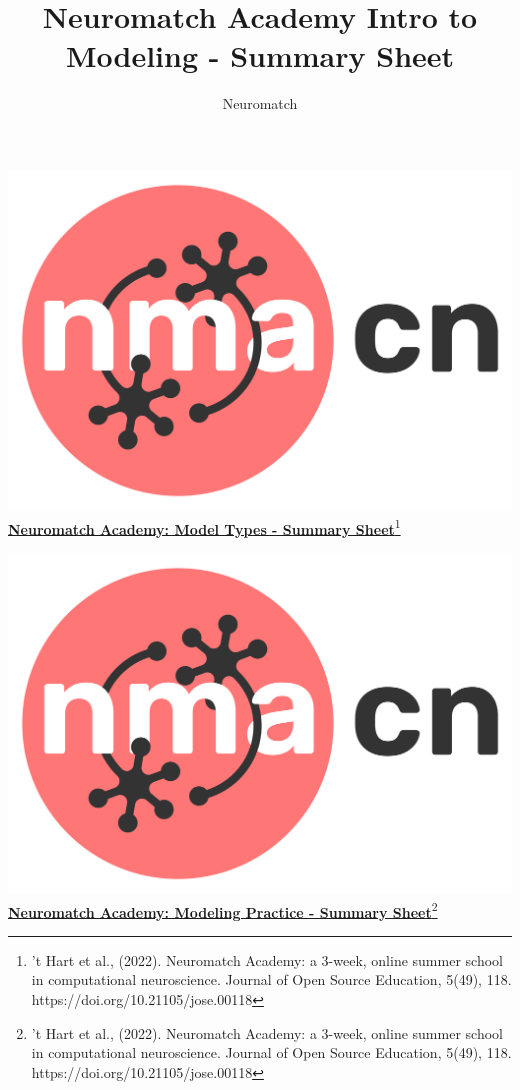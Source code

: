 \documentclass[10pt,a4paper]{article}
\title{Neuromatch Academy Intro to Modeling - Summary Sheet}
\author{Neuromatch}
\begin{document}
\includegraphics[scale=0.03]{Figures/NMACN.png}\href{https://compneuro.neuromatch.io/tutorials/intro.html}{\textbf{\Huge{Neuromatch Academy: Model Types - Summary Sheet}}\footnote{’t Hart et al., (2022). Neuromatch Academy: a 3-week, online summer school in computational neuroscience. Journal of Open Source Education, 5(49), 118. https://doi.org/10.21105/jose.00118}}
\small
\begin{multicols}{3}

\let\clearpage\relax

\end{multicols}

\newpage
\includegraphics[scale=0.03]{Figures/NMACN.png}\href{https://compneuro.neuromatch.io/tutorials/W1D2_ModelingPractice/chapter_title.html}{\textbf{\Huge{Neuromatch Academy: Modeling Practice - Summary Sheet}}\footnote{’t Hart et al., (2022). Neuromatch Academy: a 3-week, online summer school in computational neuroscience. Journal of Open Source Education, 5(49), 118. https://doi.org/10.21105/jose.00118}}
\begin{multicols}{3}

\end{multicols}
\end{document}
